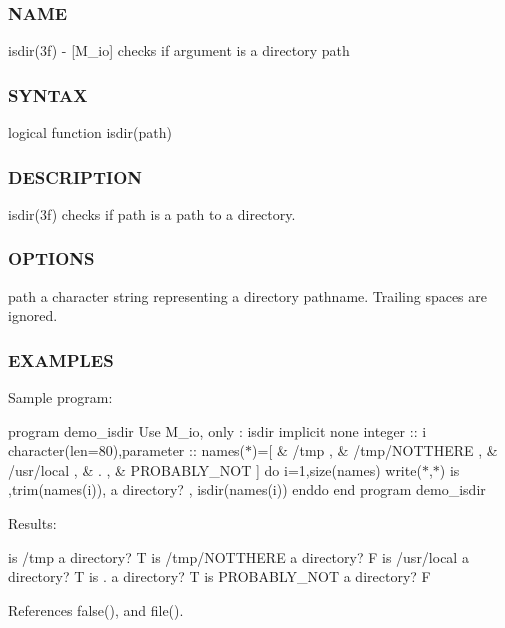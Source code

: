 \subsubsection*{N\+A\+ME}

isdir(3f) -\/ \mbox{[}M\+\_\+io\mbox{]} checks if argument is a directory path \subsubsection*{S\+Y\+N\+T\+AX}

logical function isdir(path) \subsubsection*{D\+E\+S\+C\+R\+I\+P\+T\+I\+ON}

isdir(3f) checks if path is a path to a directory. \subsubsection*{O\+P\+T\+I\+O\+NS}

path a character string representing a directory pathname. Trailing spaces are ignored. \subsubsection*{E\+X\+A\+M\+P\+L\+ES}

Sample program\+:

program demo\+\_\+isdir Use M\+\_\+io, only \+: isdir implicit none integer \+:\+: i character(len=80),parameter \+:\+: names($\ast$)=\mbox{[} \& \textquotesingle{}/tmp \textquotesingle{}, \& \textquotesingle{}/tmp/\+N\+O\+T\+T\+H\+E\+RE \textquotesingle{}, \& \textquotesingle{}/usr/local \textquotesingle{}, \& \textquotesingle{}. \textquotesingle{}, \& \textquotesingle{}P\+R\+O\+B\+A\+B\+L\+Y\+\_\+\+N\+OT \textquotesingle{}\mbox{]} do i=1,size(names) write($\ast$,$\ast$)\textquotesingle{} is \textquotesingle{},trim(names(i)),\textquotesingle{} a directory? \textquotesingle{}, isdir(names(i)) enddo end program demo\+\_\+isdir

Results\+:

is /tmp a directory? T is /tmp/\+N\+O\+T\+T\+H\+E\+RE a directory? F is /usr/local a directory? T is . a directory? T is P\+R\+O\+B\+A\+B\+L\+Y\+\_\+\+N\+OT a directory? F 

References false(), and file().

\mbox{\label{namespacem__io_a673f7f7e137424eed9c6a736901a5cbc}} 
